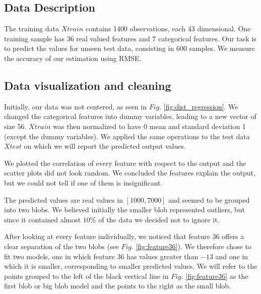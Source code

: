 \subsection{Data Description}
The training data $Xtrain$ contains 1400 observations, each 43 dimensional. One training sample has 36 real valued features and 7 categorical features. Our task is to predict the values for unseen test data, consisting in 600 samples. We measure the accuracy of our estimation using RMSE. 

\subsection{Data visualization and cleaning}
Initially, our data was not centered, as seen in $Fig.$ \ref{fig:dist_regression}.
We changed the categorical features into dummy variables, leading to a new vector of size 56. $Xtrain$ was then normalized to have 0 mean and standard deviation 1 (except the dummy variables). We applied the same operations to the test data $Xtest$ on which we will report the predicted output values.

We plotted the correlation of every feature with respect to the output and the scatter plots did not look random. We concluded the features explain the output, but we could not tell if one of them is insignificant.

The predicted values are real values in $[1000,7000]$ and seemed to be grouped into two blobs. We believed initially the smaller blob represented outliers, but since it contained almost $10\%$ of the data we decided not to ignore it.

After looking at every feature individually, we noticed that feature 36 offers a clear separation of the two blobs (see $Fig.$ \ref{fig:feature36}). We therefore chose to fit two models, one in which feature 36 has values greater than $-13$ and one in which it is smaller, corresponding to smaller predicted values. We will refer to the points grouped to the left of the black vertical line in $Fig.$ \ref{fig:feature36} as the first blob or big blob model and the points to the right as the small blob.


